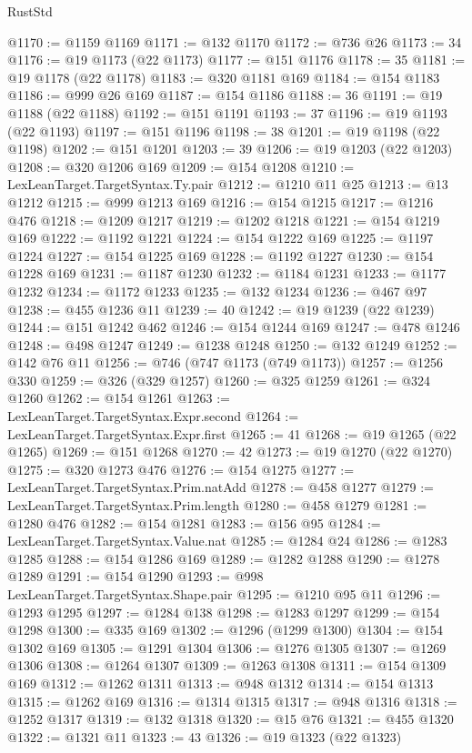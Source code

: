 \begin{lexlean}{RustStd}
\begin{coremodule}
{\begin{coremodule}
{{{{{{{{{{{{{{{{{{{{{{{{{{{{{{{{{{{{{{{{{{{{{{{{{{{{{{{{{{{{{{{{{{{{{{{{{{{{{{{{@1170 := @1159 @1169
@1171 := @132 @1170
@1172 := @736 @26
@1173 := 34
@1176 := @19 @1173 (@22 @1173)
@1177 := @151 @1176
@1178 := 35
@1181 := @19 @1178 (@22 @1178)
@1183 := @320 @1181 @169
@1184 := @154 @1183
@1186 := @999 @26 @169
@1187 := @154 @1186
@1188 := 36
@1191 := @19 @1188 (@22 @1188)
@1192 := @151 @1191
@1193 := 37
@1196 := @19 @1193 (@22 @1193)
@1197 := @151 @1196
@1198 := 38
@1201 := @19 @1198 (@22 @1198)
@1202 := @151 @1201
@1203 := 39
@1206 := @19 @1203 (@22 @1203)
@1208 := @320 @1206 @169
@1209 := @154 @1208
@1210 := LexLeanTarget.TargetSyntax.Ty.pair
@1212 := @1210 @11 @25
@1213 := @13 @1212
@1215 := @999 @1213 @169
@1216 := @154 @1215
@1217 := @1216 @476
@1218 := @1209 @1217
@1219 := @1202 @1218
@1221 := @154 @1219 @169
@1222 := @1192 @1221
@1224 := @154 @1222 @169
@1225 := @1197 @1224
@1227 := @154 @1225 @169
@1228 := @1192 @1227
@1230 := @154 @1228 @169
@1231 := @1187 @1230
@1232 := @1184 @1231
@1233 := @1177 @1232
@1234 := @1172 @1233
@1235 := @132 @1234
@1236 := @467 @97
@1238 := @455 @1236 @11
@1239 := 40
@1242 := @19 @1239 (@22 @1239)
@1244 := @151 @1242 @462
@1246 := @154 @1244 @169
@1247 := @478 @1246
@1248 := @498 @1247
@1249 := @1238 @1248
@1250 := @132 @1249
@1252 := @142 @76 @11
@1256 := @746 (@747 @1173 (@749 @1173))
@1257 := @1256 @330
@1259 := @326 (@329 @1257)
@1260 := @325 @1259
@1261 := @324 @1260
@1262 := @154 @1261
@1263 := LexLeanTarget.TargetSyntax.Expr.second
@1264 := LexLeanTarget.TargetSyntax.Expr.first
@1265 := 41
@1268 := @19 @1265 (@22 @1265)
@1269 := @151 @1268
@1270 := 42
@1273 := @19 @1270 (@22 @1270)
@1275 := @320 @1273 @476
@1276 := @154 @1275
@1277 := LexLeanTarget.TargetSyntax.Prim.natAdd
@1278 := @458 @1277
@1279 := LexLeanTarget.TargetSyntax.Prim.length
@1280 := @458 @1279
@1281 := @1280 @476
@1282 := @154 @1281
@1283 := @156 @95
@1284 := LexLeanTarget.TargetSyntax.Value.nat
@1285 := @1284 @24
@1286 := @1283 @1285
@1288 := @154 @1286 @169
@1289 := @1282 @1288
@1290 := @1278 @1289
@1291 := @154 @1290
@1293 := @998 LexLeanTarget.TargetSyntax.Shape.pair
@1295 := @1210 @95 @11
@1296 := @1293 @1295
@1297 := @1284 @138
@1298 := @1283 @1297
@1299 := @154 @1298
@1300 := @335 @169
@1302 := @1296 (@1299 @1300)
@1304 := @154 @1302 @169
@1305 := @1291 @1304
@1306 := @1276 @1305
@1307 := @1269 @1306
@1308 := @1264 @1307
@1309 := @1263 @1308
@1311 := @154 @1309 @169
@1312 := @1262 @1311
@1313 := @948 @1312
@1314 := @154 @1313
@1315 := @1262 @169
@1316 := @1314 @1315
@1317 := @948 @1316
@1318 := @1252 @1317
@1319 := @132 @1318
@1320 := @15 @76
@1321 := @455 @1320
@1322 := @1321 @11
@1323 := 43
@1326 := @19 @1323 (@22 @1323)
}}}}}}}}}}}}}}}}}}}}}}}}}}}}}}}}}}}}}}}}}}}}}}}}}}}}}}}}}}}}}}}}}}}}}}}}}}}}}}}}
\end{coremodule}}
\end{coremodule}
\end{lexlean}
